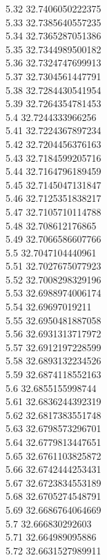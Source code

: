 {5.32	32.7406050222375\\
5.33	32.7385640557235\\
5.34	32.7365287051386\\
5.35	32.7344989500182\\
5.36	32.7324747699913\\
5.37	32.7304561447791\\
5.38	32.7284430541954\\
5.39	32.7264354781453\\
5.4	32.7244333966256\\
5.41	32.7224367897234\\
5.42	32.7204456376163\\
5.43	32.7184599205716\\
5.44	32.7164796189459\\
5.45	32.7145047131847\\
5.46	32.7125351838217\\
5.47	32.7105710114788\\
5.48	32.708612176865\\
5.49	32.7066586607766\\
5.5	32.7047104440961\\
5.51	32.7027675077923\\
5.52	32.7008298329196\\
5.53	32.6988974006174\\
5.54	32.69697019211\\
5.55	32.6950481887058\\
5.56	32.6931313717972\\
5.57	32.6912197228599\\
5.58	32.6893132234526\\
5.59	32.6874118552163\\
5.6	32.6855155998744\\
5.61	32.6836244392319\\
5.62	32.6817383551748\\
5.63	32.6798573296701\\
5.64	32.6779813447651\\
5.65	32.6761103825872\\
5.66	32.6742444253431\\
5.67	32.6723834553189\\
5.68	32.6705274548791\\
5.69	32.6686764064669\\
5.7	32.666830292603\\
5.71	32.664989095886\\
5.72	32.6631527989911\\
}
